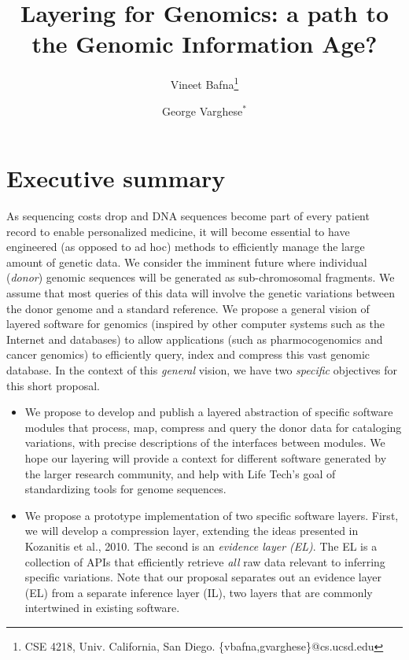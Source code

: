 \documentclass[10pt]{article}
\begin{document}
\title{\vspace{-1in} Layering for Genomics: a path to the Genomic Information Age?}
\author{Vineet Bafna\thanks{CSE 4218, Univ. California, San Diego. \{vbafna,gvarghese\}@cs.ucsd.edu} \and George Varghese$^*$}
\date{}
\maketitle
\section{Executive summary}
As sequencing costs drop and DNA sequences become part of every
patient record to enable personalized medicine, it will become
essential to have engineered (as opposed to ad hoc) methods to
efficiently manage the large amount of genetic data.  We consider the
imminent future where individual (\emph{donor}) genomic sequences will
be generated as sub-chromosomal fragments. We assume that most queries
of this data will involve the genetic variations between the donor
genome and a standard reference.  We propose a general vision of
layered software for genomics (inspired by other computer systems such
as the Internet and databases) to allow applications (such as
pharmocogenomics and cancer genomics) to efficiently query, index and
compress this vast genomic database.  In the context of this {\em
  general} vision, we have two {\em specific} objectives for this
short proposal.

\begin{itemize}
\item We propose to develop and publish a layered abstraction of
  specific software modules that process, map, compress and query the donor
  data for cataloging variations, with precise descriptions of the
  interfaces between modules.  We hope our layering will provide a context for
  different software generated by the larger
  research community, and help with Life Tech's goal of standardizing
  tools for genome sequences.
\item We propose a prototype implementation of two specific software
  layers. First, we will develop a compression layer, extending the
  ideas presented in Kozanitis et al., 2010. The second is an
  \emph{evidence layer (EL)}. The EL is a collection of APIs that
  efficiently retrieve \emph{all} raw data relevant to inferring
  specific variations.  Note that our proposal separates out an
  evidence layer (EL) from a separate inference layer (IL), two layers
  that are commonly intertwined in existing software.
  
\end{itemize}
\end{document}
